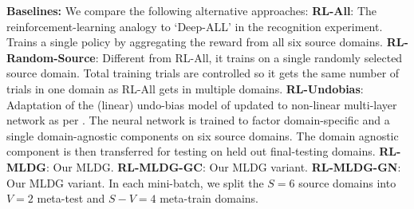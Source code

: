 \documentclass[letterpaper]{article} \usepackage{aaai18}  \usepackage{times}  \usepackage{helvet}  \usepackage{courier}  \usepackage{url}  \usepackage{graphicx}  \usepackage{amsmath}
\newcommand{\keypoint}[1]{\vspace{0.1cm}\noindent\textbf{#1}\quad}
\begin{document}
{\keypoint{Baselines:} We compare the following alternative approaches:  \textbf{RL-All}: The reinforcement-learning analogy to `Deep-ALL' in the recognition experiment. Trains a single policy by aggregating the reward from all six source domains. \textbf{RL-Random-Source}: Different from RL-All, it trains on a single randomly selected source domain. Total training trials are controlled so it gets the same number of trials in one domain as RL-All gets in multiple domains.
\textbf{RL-Undobias}: Adaptation of the (linear) undo-bias model of \cite{khosla2012undoing} updated to non-linear multi-layer network as per \cite{da2017dg}. The neural network is trained to factor domain-specific and a single domain-agnostic components on six source domains. The domain agnostic component is then transferred for testing on held out final-testing domains. \textbf{RL-MLDG}: Our  MLDG. \textbf{RL-MLDG-GC}: Our MLDG variant. \textbf{RL-MLDG-GN}: Our MLDG variant.  In each mini-batch, we split the $S=6$ source domains into $V=2$ meta-test  and $S-V=4$ meta-train domains.

\begin{table}[t]
\centering
\caption{Cart-Pole RL. Domain generalisation performance across pole length. Average reward testing on 3 held out domains with random lengths. Upper bound: 200.}
\label{rl}
\end{table}







\begin{table}[t]
\centering
\caption{Cart-Pole RL. Generalisation performance across both pole length and cart mass. Return testing on 3 held out domains with random length and mass. Upper bound: 200.}
\label{cartpole-polelen-cartmass}
\end{table}

}
\end{document}
